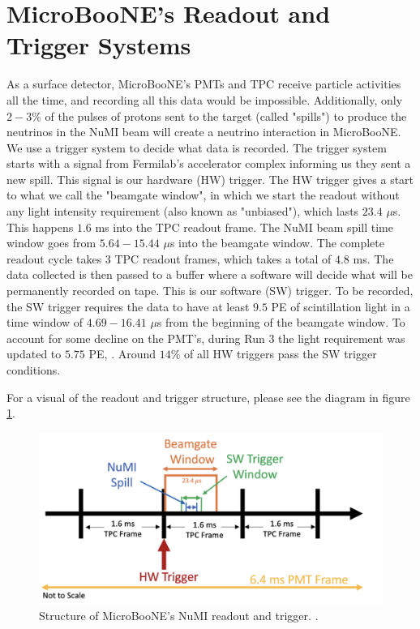 \section{MicroBooNE's Readout and Trigger Systems}

As a surface detector, MicroBooNE's PMTs and TPC receive particle activities all the time, and recording all this data would be impossible. Additionally, only $2-3\%$ of the pulses of protons sent to the target (called "spills") to produce the neutrinos in the NuMI beam will create a neutrino interaction in MicroBooNE. We use a trigger system to decide what data is recorded.
The trigger system starts with a signal from Fermilab's accelerator complex informing us they sent a new spill. This signal is our hardware (HW) trigger. The HW trigger gives a start to what we call the "beamgate window", in which we start the readout without any light intensity requirement (also known as "unbiased"), which lasts $23.4$ $\mu $s. This happens $1.6$ ms into the TPC readout frame. The NuMI beam spill time window goes from $5.64- 15.44$ $\mu$s into the beamgate window. The complete readout cycle takes 3 TPC readout frames, which takes a total of $4.8$ ms.
The data collected is then passed to a buffer where a software will decide what will be permanently recorded on tape. This is our software (SW) trigger. To be recorded, the SW trigger requires the data to have at least $9.5$ PE of scintillation light in a time window of $4.69- 16.41$ $\mu$s from the beginning of the beamgate window. To account for some decline on the PMT's, during Run 3 the light requirement was updated to $5.75$ PE, \cite{numi_redmine}. 
Around $14\%$ of all HW triggers pass the SW trigger conditions. 

For a visual of the readout and trigger structure, please see the diagram in figure \ref{trig}.

\begin{figure}[h!]
    \centering
    \includegraphics[width=130mm]{Figures/numi_trigger.jpg}
    \caption{Structure of MicroBooNE's NuMI readout and trigger. \cite{krish_phd}.}
    \label{trig}
\end{figure}

